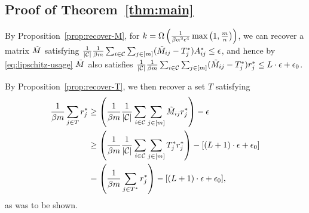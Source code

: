 \subsection{Proof of Theorem~\ref{thm:main}}
\label{thm:main-proof}

By Proposition~\ref{prop:recover-M}, for $k = \Omega\left( \frac{1}{\beta\alpha^3\epsilon^4}\max\left( 1,\frac{m}{n} \right) \right)$, 
we can recover a matrix $\tilde{M}$ satisfying 
$\frac{1}{|\mathcal{C}|}\frac{1}{\beta m}\sum_{i \in \mathcal{C}}\sum_{j \in [m]} (\tilde{M}_{ij}-T^*_{j})A^*_{ij} \leq \epsilon$, 
and hence by \eqref{eq:lipschitz-usage} $\tilde{M}$ also satisfies
$\frac{1}{|\mathcal{C}|}\frac{1}{\beta m}\sum_{i \in \mathcal{C}}\sum_{j \in [m]} (\tilde{M}_{ij}-T^*_{j})r^*_{j} \leq L \cdot \epsilon + \epsilon_0$.

By Proposition~\ref{prop:recover-T}, we then recover a set $T$ satisfying
\begin{align}
\frac{1}{\beta m}\sum_{j \in T}r^*_j &\geq \left( \frac{1}{\beta m}\frac{1}{|\mathcal{C}|}\sum_{i \in \mathcal{C}}\sum_{j \in [m]} \tilde{M}_{ij}r^*_j \right) - \epsilon \\
 &\geq \left( \frac{1}{\beta m}\frac{1}{|\mathcal{C}|}\sum_{i \in \mathcal{C}}\sum_{j \in [m]} T^*_{j}r^*_j \right) - [(L+1)\cdot\epsilon+\epsilon_0] \\
 &= \left( \frac{1}{\beta m}\sum_{j \in T^*} r^*_j \right) - [(L+1)\cdot\epsilon+\epsilon_0],
\end{align}
as was to be shown.
